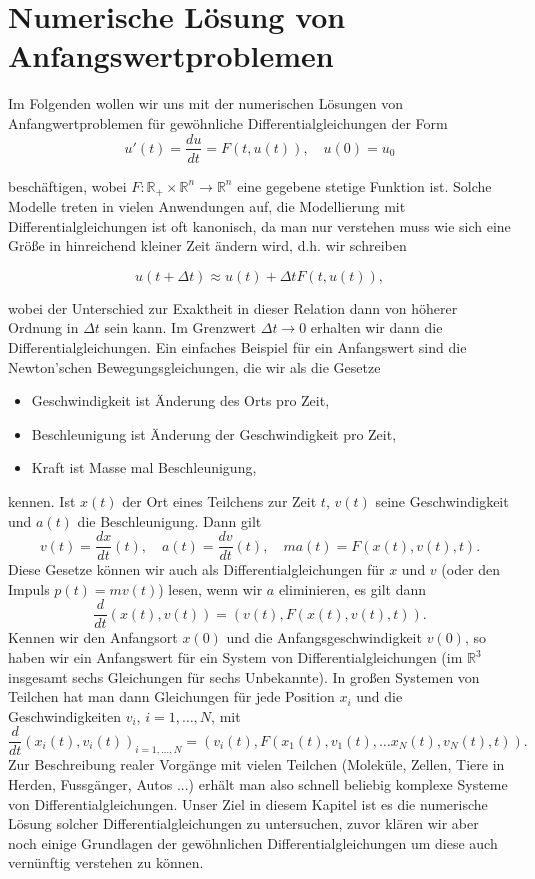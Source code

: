\chapter{Numerische Lösung von Anfangswertproblemen} 

Im Folgenden wollen wir uns mit der numerischen Lösungen von Anfangwertproblemen für gewöhnliche Differentialgleichungen der Form 
\begin{equation}
u'(t) = \frac{du}{dt} = F(t,u(t)), \quad u(0) = u_0 \label{eq:awp}
\end{equation}

beschäftigen, wobei $F: \mathbb{R}_+ \times \mathbb{R}^n \rightarrow \mathbb{R}^n$ eine gegebene stetige Funktion ist. Solche Modelle treten in vielen Anwendungen auf, die Modellierung mit Differentialgleichungen ist oft kanonisch, da man nur verstehen muss wie sich eine Größe in hinreichend kleiner Zeit ändern wird, d.h. wir schreiben

\begin{equation*}
u(t+\Delta t)  \approx u(t) + \Delta t F(t,u(t)) ,
\end{equation*}

wobei der Unterschied zur Exaktheit in dieser Relation dann von höherer Ordnung in $\Delta t$ sein kann. Im Grenzwert $\Delta t \rightarrow 0$ erhalten wir dann die Differentialgleichungen.  Ein einfaches Beispiel für ein Anfangswert sind die Newton'schen Bewegungsgleichungen, die wir als die Gesetze

\begin{itemize}
\item Geschwindigkeit ist Änderung des Orts pro Zeit,
\item Beschleunigung ist Änderung der Geschwindigkeit pro Zeit,
\item Kraft ist Masse mal Beschleunigung,
\end{itemize}

kennen. Ist $x(t)$ der Ort eines Teilchens zur Zeit $t$, $v(t)$ seine Geschwindigkeit und $a(t)$ die Beschleunigung. Dann gilt
$$ v(t) = \frac{dx}{dt}(t), \quad a(t) =  \frac{dv}{dt}(t), \quad m a(t) = F(x(t),v(t),t). $$
Diese Gesetze können wir auch als Differentialgleichungen für $x$ und $v$ (oder den Impuls $p(t)=m v(t)$) lesen, wenn wir $a$ eliminieren, es gilt dann
$$ \frac{d}{dt} (x(t),v(t)) = (v(t), F(x(t),v(t),t)). $$
Kennen wir den Anfangsort $x(0)$ und die Anfangsgeschwindigkeit $v(0)$, so haben wir ein Anfangswert für ein System von Differentialgleichungen (im $\mathbb{R}^3$ insgesamt sechs Gleichungen für sechs Unbekannte). In gro{\ss}en Systemen von Teilchen hat man dann Gleichungen für jede Position $x_i$ und die Geschwindigkeiten $v_i$, $i=1,\ldots,N$, mit 
 $$ \frac{d}{dt} (x_i(t),v_i(t))_{i=1,\ldots,N} = (v_i(t), F(x_1(t),v_1(t), \ldots x_N(t),v_N(t),t)). $$
Zur Beschreibung realer Vorgänge mit vielen Teilchen (Moleküle, Zellen, Tiere in Herden, Fussgänger, Autos ...) erhält man also schnell beliebig komplexe Systeme von Differentialgleichungen. Unser Ziel in diesem Kapitel ist es die numerische Lösung solcher Differentialgleichungen zu untersuchen, zuvor klären wir aber noch einige Grundlagen der gewöhnlichen Differentialgleichungen um diese auch vernünftig verstehen zu können.


